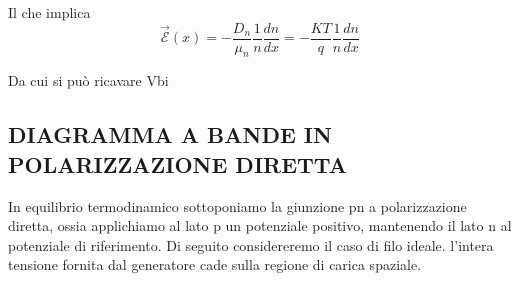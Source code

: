 Il che implica
\begin{equation}
    \mathcal{\vec{E}}(x) = - \dfrac{D_n}{\mu_n} \dfrac{1}{n} \dfrac{dn}{dx}= -\dfrac{KT}{q}\dfrac{1}{n} \dfrac{dn}{dx}
\end{equation}

Da cui si può ricavare Vbi
\begin{equation}
\end{equation}


\subsection{DIAGRAMMA A BANDE IN POLARIZZAZIONE DIRETTA}
In equilibrio termodinamico sottoponiamo la giunzione pn a polarizzazione diretta, ossia applichiamo al lato p un potenziale positivo, mantenendo il lato n al potenziale di riferimento.
Di seguito considereremo il caso di filo ideale. l'intera tensione fornita dal generatore cade sulla regione di carica spaziale.

